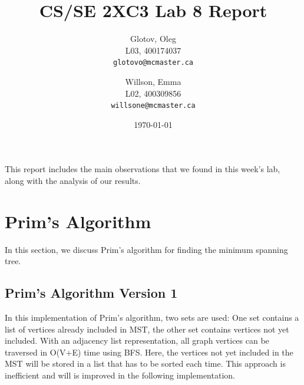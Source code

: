 \documentclass[12pt]{article}
\title{CS/SE 2XC3 Lab 8 Report}
\author{
  Glotov, Oleg\\ L03, 400174037\\
  \texttt{glotovo@mcmaster.ca}
  \and
  Willson, Emma\\ L02, 400309856\\
  \texttt{willsone@mcmaster.ca}
  }
\date{\today}
\begin{document}
\maketitle

This report includes the main observations that we found in this week's lab, along with the analysis of our results.

\newpage 
\section{Prim's Algorithm}
In this section, we discuss Prim's algorithm for finding the minimum spanning tree. 
\subsection{Prim's Algorithm Version 1}
In this implementation of Prim’s algorithm, two sets are used: One set contains a list of vertices already included in MST, the other set contains vertices not yet included. With an adjacency list representation, all graph vertices can be traversed in O(V+E) time using BFS. Here, the vertices not yet included in the MST will be stored in a list that has to be sorted each time. This approach is inefficient and will is improved in the following implementation.
\end{document}
